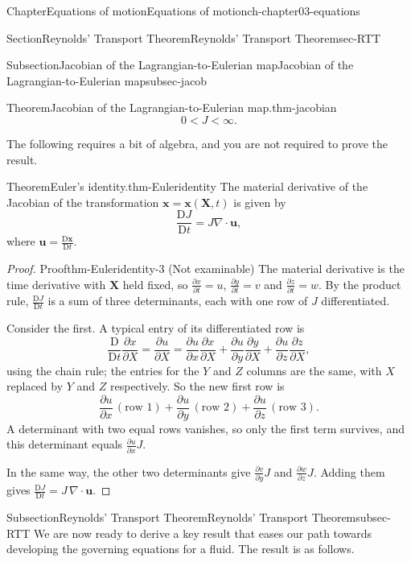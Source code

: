 \documentclass[oneside,10pt,]{book}
\numberwithin{equation}{section}
\newcommand{\DD}[2]{\frac{\mathrm{D}#1}{\mathrm{D}#2}}
\newcommand{\pd}[2]{\frac{\partial#1}{\partial#2}}
\newcommand{\bx}{\boldsymbol{x}}
\newcommand{\bX}{\boldsymbol{X}}
\newcommand{\bu}{\boldsymbol{u}}
\newcommand{\lt}{<}
\begin{document}
\begin{chapterptx}{Chapter}{Equations of motion}{}{Equations of motion}{}{}{ch-chapter03-equations}
\begin{sectionptx}{Section}{Reynolds' Transport Theorem}{}{Reynolds' Transport Theorem}{}{}{sec-RTT}
\begin{subsectionptx}{Subsection}{Jacobian of the Lagrangian-to-Eulerian map}{}{Jacobian of the Lagrangian-to-Eulerian map}{}{}{subsec-jacob}
\begin{theorem}{Theorem}{Jacobian of the Lagrangian-to-Eulerian map.}{}{thm-jacobian}
\begin{equation*}
0 \lt J \lt \infty.
\end{equation*}
%
\end{theorem}
The following requires a bit of algebra, and you are not required to prove the result.%
\begin{theorem}{Theorem}{Euler's identity.}{}{thm-Euleridentity}%
The material derivative of the Jacobian of the transformation \(\bx = \bx(\bX, t)\) is given by%
\begin{equation}
\DD{J}{t} = J \nabla \cdot \bu,\label{eqn-euler-identity}
\end{equation}
where \(\bu =
\DD{\bx}{t}\).%
\end{theorem}
\begin{proof}{Proof}{}{thm-Euleridentity-3}
(Not examinable) The material derivative is the time derivative with \(\bX\) held fixed, so \(\pd{x}{t} = u\), \(\pd{y}{t} = v\) and \(\pd{z}{t} = w\). By the product rule, \(\DD{J}{t}\) is a sum of three determinants, each with one row of \(J\) differentiated.%
\par
Consider the first. A typical entry of its differentiated row is%
\begin{equation*}
\DD{}{t}\pd{x}{X} = \pd{u}{X} = \pd{u}{x}\pd{x}{X} + \pd{u}{y}\pd{y}{X} +
\pd{u}{z}\pd{z}{X},
\end{equation*}
using the chain rule; the entries for the \(Y\) and \(Z\) columns are the same, with \(X\) replaced by \(Y\) and \(Z\) respectively. So the new first row is%
\begin{equation*}
\pd{u}{x}\,(\text{row 1}) + \pd{u}{y}\,(\text{row 2}) + \pd{u}{z}\,(\text{row 3}).
\end{equation*}
A determinant with two equal rows vanishes, so only the first term survives, and this determinant equals \(\pd{u}{x}J\).%
\par
In the same way, the other two determinants give \(\pd{v}{y}J\) and \(\pd{w}{z}J\). Adding them gives \(\DD{J}{t} = J\,\nabla\cdot\bu\).%
\end{proof}
\end{subsectionptx}
%
%
\typeout{************************************************}
\typeout{************************************************}
%
\begin{subsectionptx}{Subsection}{Reynolds' Transport Theorem}{}{Reynolds' Transport Theorem}{}{}{subsec-RTT}
We are now ready to derive a key result that eases our path towards developing the governing equations for a fluid. The result is as follows.%

\end{subsectionptx}
\end{sectionptx}
\end{chapterptx}
\end{document}
